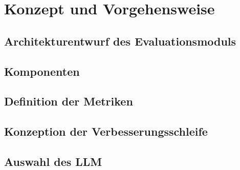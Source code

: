\chapter{Konzept und Vorgehensweise}\label{ch:konzeption}

\section{Architekturentwurf des Evaluationsmoduls}


\section{Komponenten}


\section{Definition der Metriken}


\section{Konzeption der Verbesserungsschleife}


\section{Auswahl des LLM}

